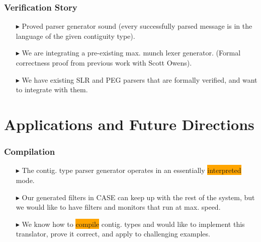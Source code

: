 \documentclass{beamer}
\newcommand{\kemph}[1]{\colorbox{orange}{#1}}
\begin{document}
\begin{frame} \frametitle{Verification Story}

\begin{itemize}

\item [$\blacktriangleright$] Proved parser generator sound (every
  successfully parsed message is in the language of the given
  contiguity type).

\item [$\blacktriangleright$] We are integrating a pre-existing
  max. munch lexer generator. (Formal correctness proof from previous
  work with Scott Owens).

\item [$\blacktriangleright$] We have existing SLR and PEG parsers
  that are formally verified, and want to integrate with them.

\end{itemize}

\end{frame}

\section{Applications and Future Directions}

\begin{frame} \frametitle{Compilation}

\begin{itemize}

\item [$\blacktriangleright$] The contig. type parser generator
  operates in an essentially \kemph{interpreted} mode.

\item [$\blacktriangleright$] Our generated filters in CASE can keep
  up with the rest of the system, but we would like to have filters
  and monitors that run at max. speed.

\item [$\blacktriangleright$] We know how to \kemph{compile}
  contig. types and would like to implement this translator, prove
  it correct, and apply to challenging examples.

\end{itemize}

\end{frame}
\end{document}
